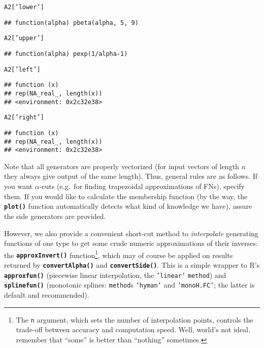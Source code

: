 \documentclass[11pt]{article}\usepackage[]{graphicx}\usepackage[]{color}
\makeatletter
\newcommand{\hlstr}[1]{\textcolor[rgb]{0.192,0.494,0.8}{#1}}%
\newcommand{\hlstd}[1]{\textcolor[rgb]{0.345,0.345,0.345}{#1}}%
\newcommand{\hlkwc}[1]{\textcolor[rgb]{0.333,0.667,0.333}{#1}}%
\newcommand{\hlkwd}[1]{\textcolor[rgb]{0.737,0.353,0.396}{\textbf{#1}}}%
\newenvironment{kframe}{%
 \def\at@end@of@kframe{}%
 \ifinner\ifhmode%
  \def\at@end@of@kframe{\end{minipage}}%
  \begin{minipage}{\columnwidth}%
 \fi\fi%
 \def\FrameCommand##1{\hskip\@totalleftmargin \hskip-\fboxsep
 \colorbox{shadecolor}{##1}\hskip-\fboxsep
     \hskip-\linewidth \hskip-\@totalleftmargin \hskip\columnwidth}%
 \MakeFramed {\advance\hsize-\width
   \@totalleftmargin\z@ \linewidth\hsize
   \@setminipage}}%
 {\par\unskip\endMakeFramed%
 \at@end@of@kframe}
\newenvironment{knitrout}{}{} %
\newcommand{\lang}[1]{\textsf{#1}\xspace}
\newcommand{\R}{\lang{R}}
\newcommand{\func}[1]{\texttt{\hlkwd{#1}}}
\newcommand{\argument}[1]{\texttt{\hlkwc{#1}}}
\newcommand{\str}[1]{\texttt{\hlstr{#1}}}
\makeatother
\begin{document}
\begin{knitrout}\small
{}\color{fgcolor}\begin{kframe}
\begin{alltt}
\hlstd{A2[}\hlstr{'lower'}\hlstd{]}
\end{alltt}
\begin{verbatim}
## function(alpha) pbeta(alpha, 5, 9)
\end{verbatim}
\begin{alltt}
\hlstd{A2[}\hlstr{'upper'}\hlstd{]}
\end{alltt}
\begin{verbatim}
## function(alpha) pexp(1/alpha-1)
\end{verbatim}
\begin{alltt}
\hlstd{A2[}\hlstr{'left'}\hlstd{]}
\end{alltt}
\begin{verbatim}
## function (x) 
## rep(NA_real_, length(x))
## <environment: 0x2c32e38>
\end{verbatim}
\begin{alltt}
\hlstd{A2[}\hlstr{'right'}\hlstd{]}
\end{alltt}
\begin{verbatim}
## function (x) 
## rep(NA_real_, length(x))
## <environment: 0x2c32e38>
\end{verbatim}
\end{kframe}
\end{knitrout}

\noindent
Note that all generators are properly vectorized (for
input vectors of length $n$ they always give output of the
same length).
Thus, general rules are as follows.
If you want $\alpha$-cuts (e.g.~for finding
trapezoidal approximations of FNs), specify them.
If you would like to calculate the membership function (by the way,
the \func{plot()} function
automatically detects what kind of knowledge we have),
assure the side generators are provided.


However, we also provide a convenient short-cut method
to \textit{interpolate} generating functions of one type
to get some crude numeric approximations of their inverses:
the \func{approxInvert()}
function\footnote{The
\argument{n} argument, which sets the number of interpolation points,
controls the trade-off between accuracy and computation speed.
Well, world's not ideal, remember that ``some'' is better than ``nothing''
sometimes.}, which may
of course be applied on results returned by
\func{convertAlpha()}
and \func{convertSide()}.
This is a simple wrapper to \R's \func{approxfun()}
(piecewise linear interpolation,
the \str{'{}linear'{}} \argument{method})
and \func{splinefun()} (monotonic
splines: \argument{method}s \str{'{}hyman{}'}
and \str{'{}monoH.FC'{}}; the latter is
default and recommended).
\end{document}
